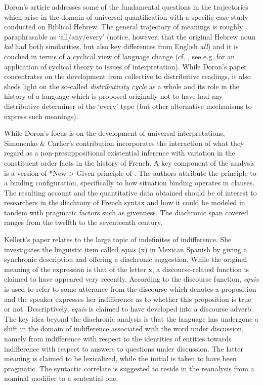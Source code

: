 \documentclass[output=paper]{langsci/langscibook}
\begin{document}
Doron’s article addresses some of the fundamental questions in the trajectories which arise in the domain of universal quantification \citep[see][]{vonFintel1995,Haspelmath1995,Beck2017} with a specific case study conducted on Biblical Hebrew. The general trajectory of meanings is roughly paraphrasable as ‘all\slash any\slash every’ (notice, however, that the original Hebrew noun \textit{kol} had both similarities, but also key differences from English \textit{all}) and it is couched in terms of a cyclical view of language change (cf. \citealt{Gelderen2011}, see e.g. \citealt{Gergel2016} for an application of cyclical theory to issues of interpretation). While Doron’s paper concentrates on the development from collective to distributive readings, it also sheds light on the so-called \textit{distributivity cycle} as a whole and its role in the history of a language which is proposed originally not to have had any distributive determiner of the ‘every’ type (but other alternative mechanisms to express such meanings).

While Doron’s focus is on the development of universal interpretations, Simonenko \& Carlier’s contribution incorporates the interaction of what they regard as a non-presuppositional existential inference with variation in the constituent order facts in the history of French. A key component of the analysis is a version of *New > Given principle of \citet{Kucerova:2012}. The authors attribute the principle to a binding configuration, specifically to how situation binding operates in clauses. The resulting account and the quantitative data obtained should be of interest to researchers in the diachrony of French syntax and how it could be modeled in tandem with pragmatic factors such as givenness. The diachronic span covered ranges from the twelfth to the seventeenth century.

Kellert’s paper relates to the large topic of indefinites of indifference. She investigates the linguistic item called \textit {equis} (x) in Mexican Spanish by giving a synchronic description and offering a diachronic suggestion. While the original meaning of the expression is that of the letter x, a discourse-related function is claimed to have appeared very recently.  According to the discourse function, \textit{equis} is used to refer to some utterance from the discourse which denotes a proposition and the speaker expresses her indifference as to whether this proposition is true or not. Descriptively, \textit{equis} is claimed to have developed into a discourse adverb. The key idea beyond the diachronic analysis is that the language has undergone a shift in the domain of indifference associated with the word under discussion, namely from indifference with respect to the identities of entities towards indifference with respect to answers to questions under discussion. The latter meaning is claimed to be lexicalized, while the initial is taken to have been pragmatic. The syntactic correlate is suggested to reside in the reanalysis from a nominal modifier to a sentential one.\largerpage
\end{document}
